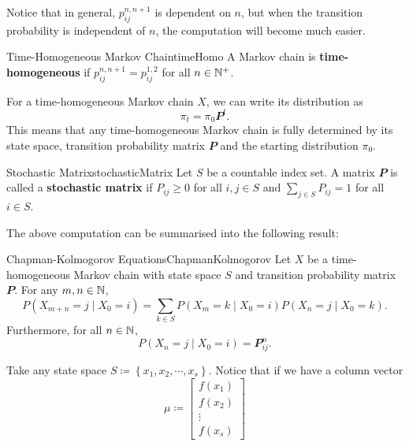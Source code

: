 \documentclass[math, code]{amznotes}
\theoremstyle{remark}
\begin{document}
Notice that in general, $p_{ij}^{n, n + 1}$ is dependent on $n$, but when the transition probability is independent of $n$, the computation will become much easier.
\begin{dfnbox}{Time-Homogeneous Markov Chain}{timeHomo}
    A Markov chain is {\color{red} \textbf{time-homogeneous}} if $p_{ij}^{n, n + 1} = p_{ij}^{1, 2}$ for all $n \in \mathbb{N}^+$.
\end{dfnbox}
For a time-homogeneous Markov chain $X$, we can write its distribution as 
\begin{equation*}
    \pi_t = \pi_0\mathbfit{P}^t.
\end{equation*}
This means that any time-homogeneous Markov chain is fully determined by its state space, transition probability matrix $\mathbfit{P}$ and the starting distribution $\pi_0$.
\begin{dfnbox}{Stochastic Matrix}{stochasticMatrix}
    Let $S$ be a countable index set. A matrix $\mathbfit{P}$ is called a {\color{red} \textbf{stochastic matrix}} if $P_{ij} \geq 0$ for all $i, j \in S$ and $\sum_{j \in S}P_{ij} = 1$ for all $i \in S$.
\end{dfnbox}
The above computation can be summarised into the following result:
\begin{thmbox}{Chapman-Kolmogorov Equations}{ChapmanKolmogorov}
    Let $X$ be a time-homogeneous Markov chain with state space $S$ and transition probability matrix $\mathbfit{P}$. For any $m, n \in \mathbb{N}$, 
    \begin{equation*}
        P\left(X_{m + n} = j \mid X_0 = i\right) = \sum_{k \in S}P\left(X_m = k \mid X_0 = i\right)P\left(X_n = j \mid X_0 = k\right).
    \end{equation*}
    Furthermore, for all $n \in \mathbb{N}$,\
    \begin{equation*}
        P\left(X_n = j \mid X_0 = i\right) = \mathbfit{P}^n_{ij}.
    \end{equation*}
\end{thmbox}
Take any state space $S \coloneqq \left\{x_1, x_2, \cdots, x_s\right\}$. Notice that if we have a column vector 
\begin{equation*}
    \mu \coloneqq \begin{bmatrix}
        f\left(x_1\right) \\
        f\left(x_2\right) \\
        \vdots \\
        f\left(x_s\right)
    \end{bmatrix}
\end{equation*}
\end{document}
